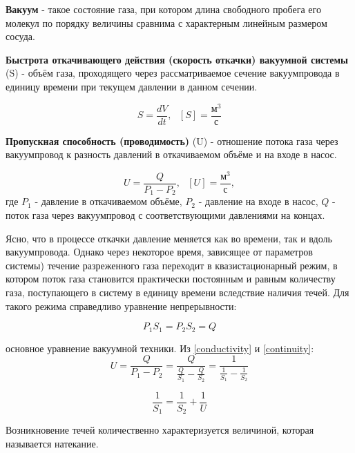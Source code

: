 \documentclass[15pt,a5paper,reqno]{article}
\begin{document}
    \textbf{Вакуум} - такое состояние газа, при котором длина свободного пробега его молекул по порядку величины сравнима с характерным линейным размером сосуда.
    
    \textbf{Быстрота откачивающего действия (скорость откачки) вакуумной системы} (S) - объём газа, проходящего через рассматриваемое сечение вакуумпровода в единицу времени при текущем давлении в данном сечении.
    
    \begin{equation}
        S = \frac{dV}{dt},\>\>\>[S] = \frac{\text{м}^3}{\text{с}}
    \end{equation}
    
    \textbf{Пропускная способность (проводимость)} (U) - отношение потока газа через вакуумпровод к разность давлений в откачиваемом объёме и на входе в насос.
    
    \begin{equation}\label{conductivity}
        U = \frac{Q}{P_1 - P_2},\>\>\>[U] = \frac{\text{м}^3}{\text{с}},
    \end{equation}
    где $P_1$ - давление в откачиваемом объёме, $P_2$ - давление на входе в насос, $Q$ - поток газа через вакуумпровод с соответствующими давлениями на концах.
    
    Ясно, что в процессе откачки давление меняется как во времени, так и вдоль вакуумпровода. Однако через некоторое время, зависящее от параметров системы) течение разреженного газа переходит в квазистационарный режим, в котором поток газа становится практически постоянным и равным количеству газа, поступающего в систему в единицу времени вследствие наличия течей. Для такого режима справедливо уравнение непрерывности:
    
    \begin{equation}\label{continuity}
        P_1S_1 = P_2S_2 = Q
    \end{equation}
    
     основное уравнение вакуумной техники. Из \eqref{conductivity} и \eqref{continuity}:
    \[U = \frac{Q}{P_1 - P_2} = \frac{Q}{\frac{Q}{S_1} - \frac{Q}{S_2}} = \frac{1}{\frac{1}{S_1} - \frac{1}{S_2}}\]
    
    \begin{equation}\label{main}
        \frac{1}{S_1} = \frac{1}{S_2} + \frac{1}{U}
    \end{equation}
    
    Возникновение течей количественно характеризуется величиной, которая называется натекание.
    
\end{document}
